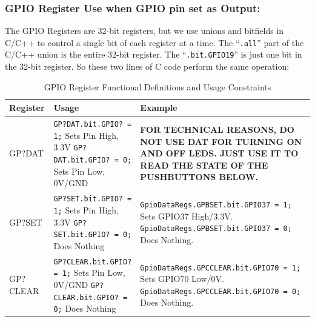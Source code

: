 \documentclass[11pt]{article}
\begin{document}
\subsubsection*{GPIO Register Use when GPIO pin set as Output:}
The GPIO Registers are 32-bit registers, but we use unions and bitfields in C/C++ to control a single bit of each register at a time. The “\verb|.all|” part of the C/C++ union is the entire 32-bit register. The “\verb|.bit.GPIO19|” is just one bit in the 32-bit register. So these two lines of C code perform the same operation:
%
\begin{table}[H]
    \centering
    \caption{GPIO Register Functional Definitions and Usage Constraints}
    \label{tab:gpio_registers_output}
    \footnotesize
    \renewcommand{\arraystretch}{1.2}
    \begin{tabular}{|p{}|p{}|p{}|}
        \hline
        \textbf{Register} & \textbf{Usage} & \textbf{Example} \\ \hline
        GP?DAT &
        \texttt{GP?DAT.bit.GPIO? = 1;} \newline Sets Pin High, 3.3V \newline
        \texttt{GP?DAT.bit.GPIO? = 0;} \newline Sets Pin Low, 0V/GND \newline
        & \textbf{FOR TECHNICAL REASONS, DO NOT USE DAT FOR TURNING ON AND OFF LEDS. JUST USE IT TO READ THE STATE OF THE PUSHBUTTONS BELOW.}
        \\ \hline
        GP?SET &
        \texttt{GP?SET.bit.GPIO? = 1;} \newline Sets Pin High, 3.3V \newline
        \texttt{GP?SET.bit.GPIO? = 0;} \newline Does Nothing &
        \texttt{GpioDataRegs.GPBSET.bit.GPIO37 = 1;} \newline Sets GPIO37 High/3.3V. \newline \texttt{GpioDataRegs.GPBSET.bit.GPIO37 = 0;} \newline Does Nothing. \\ \hline
        GP?CLEAR &
        \texttt{GP?CLEAR.bit.GPIO? = 1;} \newline Sets Pin Low, 0V/GND \newline
        \texttt{GP?CLEAR.bit.GPIO? = 0;} \newline Does Nothing &
        \texttt{GpioDataRegs.GPCCLEAR.bit.GPIO70 = 1;} \newline Sets GPIO70 Low/0V. \newline \texttt{GpioDataRegs.GPCCLEAR.bit.GPIO70 = 0;} \newline Does Nothing. \\ \hline

\end{tabular}
\end{table}
\end{document}
